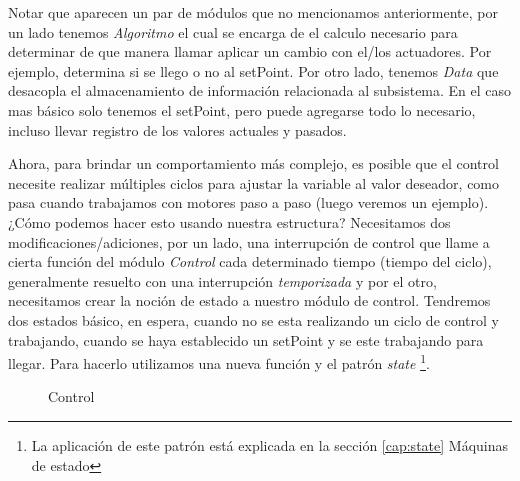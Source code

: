 Notar que aparecen un par de módulos que no mencionamos anteriormente, por un lado tenemos \textit{Algoritmo} el cual se encarga de el calculo necesario para determinar de que manera llamar aplicar un cambio con el/los actuadores. Por ejemplo, determina si se llego o no al setPoint. Por otro lado, tenemos \textit{Data} que desacopla el almacenamiento de información relacionada al subsistema. En el caso mas básico solo tenemos el setPoint, pero puede agregarse todo lo necesario, incluso llevar registro de los valores actuales y pasados.

Ahora, para brindar un comportamiento más complejo, es posible que el control necesite realizar múltiples ciclos para ajustar la variable al valor deseador, como pasa cuando trabajamos con motores paso a paso (luego veremos un ejemplo). ¿Cómo podemos hacer esto usando nuestra estructura? Necesitamos dos modificaciones/adiciones, por un lado, una interrupción de control que llame a cierta función del módulo \textit{Control} cada determinado tiempo (tiempo del ciclo), generalmente resuelto con una interrupción \textit{temporizada} y por el otro, necesitamos crear la noción de estado a nuestro módulo de control. Tendremos dos estados básico, en espera, cuando no se esta realizando un ciclo de control y trabajando, cuando se haya establecido un setPoint y se este trabajando para llegar. Para hacerlo utilizamos una nueva función y el patrón \textit{state} \footnote{La aplicación de este patrón está explicada en la sección \ref{cap:state} Máquinas de estado}.

\begin{figure}[h]
\caption{Control}
\begin{center}
\end{center}
\end{figure}

